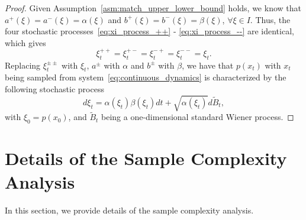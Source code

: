 \documentclass[letterpaper]{article} %
\begin{document}
\begin{proof}
    Given Assumption~\ref{asm:match_upper_lower_bound} holds, we know that $a^+(\xi) = a^-(\xi) = \alpha(\xi)$ and $b^+(\xi) = b^-(\xi) = \beta(\xi)$, $\forall \xi \in I$. Thus, the four stochastic processes~\eqref{eq:xi_process_++} - \eqref{eq:xi_process_--} are identical, which gives 
    \begin{equation}
        \xi_t^{++} = \xi_t^{+-} = \xi_t^{-+} = \xi_t^{--} = \xi_t.
    \end{equation}
    Replacing $\xi_t^{\pm \pm}$ with $\xi_t$, $a^\pm$ with $\alpha$ and $b^\pm$ with $\beta$, we have that $p(x_t)$ with $x_t$ being sampled from system~\eqref{eq:continuous_dynamics} is characterized by the following stochastic process
    \begin{equation}
    d \xi_t = \alpha\left(\xi_t\right) \beta\left(\xi_t\right) d t + \sqrt{\alpha\left(\xi_t\right)} d \tilde{B}_t,
\end{equation}
with $\xi_0 = p(x_0)$, and $\tilde{B}_t$ being a one-dimensional standard Wiener process.
    
    
\end{proof}



\section{Details of the Sample Complexity Analysis}

In this section, we provide details of the sample complexity analysis. 
\end{document}
